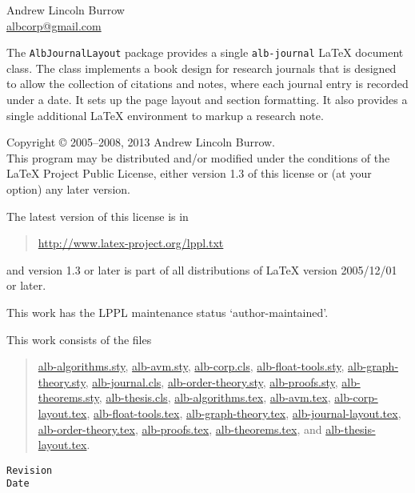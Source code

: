 \documentclass[11pt,a4paper,oneside,titlepage]{alb-corp}
\begin{document}



\begin{albTitlePage}


  Andrew Lincoln Burrow\\
  \url{albcorp@gmail.com}



  The \texttt{AlbJournalLayout} package provides a single
  \texttt{alb-journal} \LaTeX{} document class.  The class implements a
  book design for research journals that is designed to allow the
  collection of citations and notes, where each journal entry is
  recorded under a date.  It sets up the page layout and section
  formatting.  It also provides a single additional \LaTeX{} environment
  to markup a research note.



  Copyright \copyright{} 2005--2008, 2013 Andrew Lincoln Burrow.\\
  This program may be distributed and/or modified under the conditions
  of the \LaTeX{} Project Public License, either version 1.3 of this
  license or (at your option) any later version.

  \medskip{}

  The latest version of this license is in
  \begin{quote}
    \url{http://www.latex-project.org/lppl.txt}
  \end{quote}
  and version 1.3 or later is part of all distributions of LaTeX version
  2005/12/01 or later.

  \medskip{}

  This work has the LPPL maintenance status `author-maintained'.

  \medskip{}

  This work consists of the files
  \begin{quote}
    \begin{flushleft}
      \url{alb-algorithms.sty}, \url{alb-avm.sty}, \url{alb-corp.cls},
      \url{alb-float-tools.sty}, \url{alb-graph-theory.sty},
      \url{alb-journal.cls}, \url{alb-order-theory.sty},
      \url{alb-proofs.sty}, \url{alb-theorems.sty},
      \url{alb-thesis.cls}, \url{alb-algorithms.tex}, \url{alb-avm.tex},
      \url{alb-corp-layout.tex}, \url{alb-float-tools.tex},
      \url{alb-graph-theory.tex}, \url{alb-journal-layout.tex},
      \url{alb-order-theory.tex}, \url{alb-proofs.tex},
      \url{alb-theorems.tex}, and \url{alb-thesis-layout.tex}.
    \end{flushleft}
  \end{quote}



  \verb$Revision$\\
  \verb$Date$

\end{albTitlePage}
\end{document}
